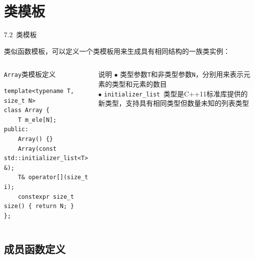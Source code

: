 \section{类模板}


\begin{frame}[fragile]{7.2~类模板}

类似函数模板，可以定义一个类模板用来生成具有\alert{相同结构}的一族类实例：

\vspace{-4mm}

\begin{columns}[t]

\begin{blueblock}{\texttt{Array}类模板定义}
\begin{lstlisting}[moreemph={T}]
template<typename T, size_t N>
class Array {
    T m_ele[N];
public:
    Array() {}
    Array(const std::initializer_list<T> &);
    T& operator[](size_t i);
    constexpr size_t size() { return N; }
};
\end{lstlisting}
\end{blueblock}

\begin{yellowblock}{说明}
$\bullet$ 类型参数\texttt{T}和非类型参数\texttt{N}，分别用来表示元素的类型和元素的数目\\
$\bullet$ \alert{\texttt{initializer\_list}}~类型是C++11标准库提供的新类型，支持具有相同类型但数量未知的列表类型
\end{yellowblock}

\end{columns}

\end{frame}


\subsection{成员函数定义}



